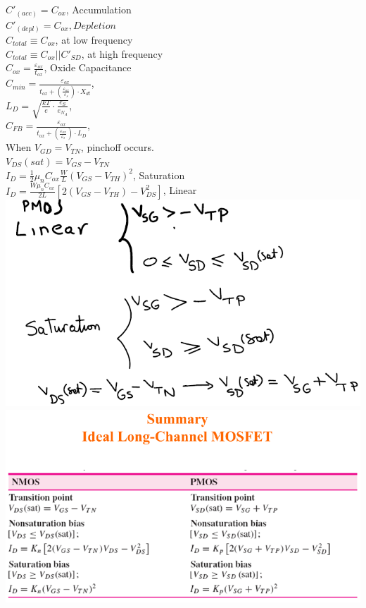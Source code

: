 \documentclass[10pt,landscape]{article}
\begin{document}
\begin{multicols}{3}
$C'_{(acc)} = C_{ox}$, Accumulation\\
$C'_{(depl)} = C_{ox}, Depletion$\\
$C_{total} \equiv C_{ox}$,  at low frequency\\
$C_{total} \equiv C_{ox} || C'_{SD}$,  at high frequency\\
$C_{ox} = \frac{\varepsilon_{ox}}{t_{ox}}$, Oxide Capacitance\\
$C_{min} = \frac{\varepsilon_{ox}}{t_{ox} + ( \frac{\varepsilon_{ox}}{\varepsilon_s} )\cdot X_{dt}}$, \\
$L_D = \sqrt{ \frac{kT}{e} \cdot \frac{e_S}{e_{N_A} }}$, \\
$C_{FB} = \frac{\varepsilon_{ox}}{t_{ox} + ( \frac{\varepsilon_{ox}}{\varepsilon_s} )\cdot L_D}$, \\
When $ V_{GD} = V_{TN}$, pinchoff occurs.\\
$V_{DS}(sat) = V_{GS} - V_{TN}$\\
$I_D = \frac{1}{2} \mu_n C_{ox} \frac{W}{L} \left( V_{GS} - V_{TH} \right)^2$, Saturation\\
$I_D =  \frac{W\mu_n C_{ox}}{2L} \left[ 2(V_{GS} - V_{TH}) - V_{DS}^2 \right]$, Linear\\


\includegraphics[width = \linewidth]{./img/123}
\includegraphics[width = \linewidth]{./img/1234}





\end{multicols}
\end{document}
